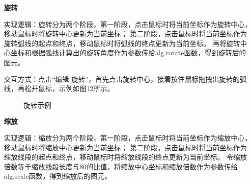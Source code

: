 \documentclass[a4paper,UTF8]{article}
\begin{document}
\textbf{旋转}

实现逻辑：旋转分为两个阶段，第一阶段，点击鼠标时将当前坐标作为旋转中心，移动鼠标时将旋转中心更新为当前坐标；
第二阶段，点击鼠标时将当前坐标作为旋转弧线的起点和终点，移动鼠标时将弧线的终点更新为当前坐标。
再将旋转中心坐标和根据弧线计算出的旋转角度作为参数传给alg.rotate函数，得到旋转后的图元。

交互方式：点击“编辑-旋转”，首先点击旋转中心，接着按住鼠标拖拽出旋转的弧线，再松开鼠标，示例如图12所示。
\begin{figure}[H]
    \centering
        \caption{旋转示例}
\end{figure}

\textbf{缩放}

实现逻辑：缩放分为两个阶段，第一阶段，点击鼠标时将当前坐标作为缩放中心，移动鼠标时将缩放中心更新为当前坐标；
第二阶段，点击鼠标时将当前坐标作为缩放线段的起点和终点，移动鼠标时将缩放线段的终点更新为当前坐标。
令缩放倍数等于缩放线段长度与80的比值，将缩放中心坐标和缩放倍数作为参数传给alg.scale函数，得到缩放后的图元。
\end{document}
